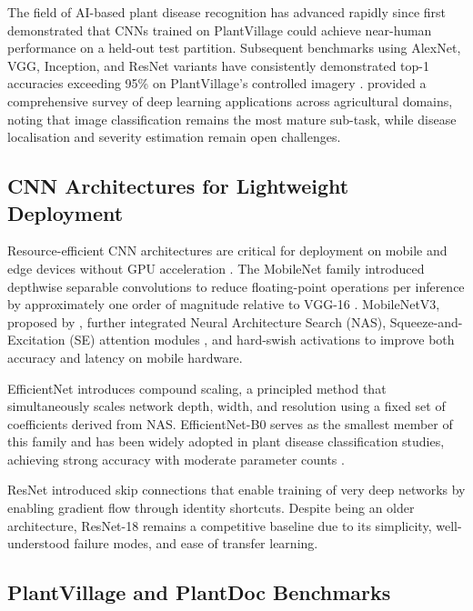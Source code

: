 \documentclass[pdflatex,sn-mathphys-num]{sn-jnl}
\begin{document}
The field of AI-based plant disease recognition has advanced rapidly since
\citet{mohanty2016} first demonstrated that CNNs trained on PlantVillage could
achieve near-human performance on a held-out test partition. Subsequent benchmarks
using AlexNet, VGG, Inception, and ResNet variants have consistently demonstrated
top-1 accuracies exceeding 95\% on PlantVillage's controlled imagery
\citep{ferentinos2018deep,too2019comparative}. \citet{kamilaris2018deep} provided
a comprehensive survey of deep learning applications across agricultural domains,
noting that image classification remains the most mature sub-task, while disease
localisation and severity estimation remain open challenges.

\subsection{CNN Architectures for Lightweight Deployment}

Resource-efficient CNN architectures are critical for deployment on mobile and
edge devices without GPU acceleration \citep{howard2017mobilenets}. The MobileNet
family introduced depthwise separable convolutions to reduce floating-point operations
per inference by approximately one order of magnitude relative to VGG-16
\citep{howard2017mobilenets}. MobileNetV3, proposed by \citet{howard2019mobilenetv3},
further integrated Neural Architecture Search (NAS), Squeeze-and-Excitation (SE)
attention modules \citep{hu2018squeeze}, and hard-swish activations to improve both
accuracy and latency on mobile hardware.

EfficientNet \citep{tan2019efficientnet} introduces compound scaling, a principled
method that simultaneously scales network depth, width, and resolution using a fixed
set of coefficients derived from NAS. EfficientNet-B0 serves as the smallest member
of this family and has been widely adopted in plant disease classification studies,
achieving strong accuracy with moderate parameter counts \citep{atila2021plant}.

ResNet \citep{he2016resnet} introduced skip connections that enable training of very
deep networks by enabling gradient flow through identity shortcuts. Despite being an
older architecture, ResNet-18 remains a competitive baseline due to its simplicity,
well-understood failure modes, and ease of transfer learning.

\subsection{PlantVillage and PlantDoc Benchmarks}
\end{document}
